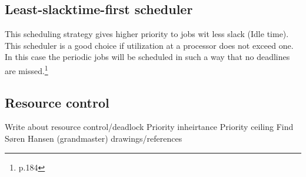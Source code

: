 
\subsection{Least-slacktime-first scheduler}
This scheduling strategy gives higher priority to jobs wit less slack (Idle time). This scheduler is a good choice if utilization at a processor does not exceed one. In this case the periodic jobs will be scheduled in such a way that no deadlines are missed.\footnote{\cite{Fokkink1965} p.184}

\subsection{Resource control}
Write about resource control/deadlock
Priority inheirtance
Priority ceiling
Find Søren Hansen (grandmaster) drawings/references